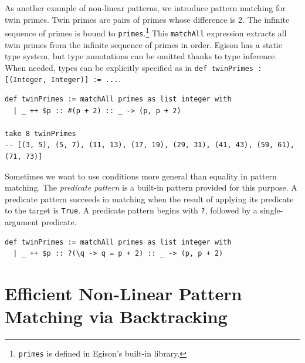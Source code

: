 As another example of non-linear patterns, we introduce pattern matching for twin primes.
Twin primes are pairs of primes whose difference is 2.
The infinite sequence of primes is bound to \lstinline{primes}.\footnote{\lstinline{primes} is defined in Egison's built-in library.}
This \lstinline{matchAll} expression extracts all twin primes from the infinite sequence of primes in order.
Egison has a static type system, but type annotations can be omitted thanks to type inference.
When needed, types can be explicitly specified as in \lstinline{def twinPrimes : [(Integer, Integer)] := ...}.
\begin{lstlisting}[language=egison,numbers=none]
def twinPrimes := matchAll primes as list integer with
  | _ ++ $p :: #(p + 2) :: _ -> (p, p + 2)

take 8 twinPrimes
-- [(3, 5), (5, 7), (11, 13), (17, 19), (29, 31), (41, 43), (59, 61), (71, 73)]
\end{lstlisting}


Sometimes we want to use conditions more general than equality in pattern matching.
The \emph{predicate pattern} is a built-in pattern provided for this purpose.
A predicate pattern succeeds in matching when the result of applying its predicate to the target is \lstinline{True}.
A predicate pattern begins with \lstinline{?}, followed by a single-argument predicate.
\begin{lstlisting}[language=egison,numbers=none]
def twinPrimes := matchAll primes as list integer with
  | _ ++ $p :: ?(\q -> q = p + 2) :: _ -> (p, p + 2)
\end{lstlisting}

\section{Efficient Non-Linear Pattern Matching via Backtracking}\label{quick-backtrack}


